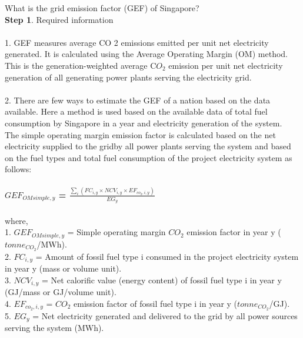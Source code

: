 \documentclass[11pt]{exam}
\begin{document}
\begin{questions}
\question
\label{Q25:Grid emission factor of Singapore}
What is the grid emission factor (GEF) of Singapore? \\
\textbf{Step 1}. Required information \\ \\
                1. GEF measures average CO 2 emissions emitted per unit net electricity generated. It is calculated using the Average Operating Margin (OM) method. This is the generation-weighted average C$O_{2}$ emission per unit net electricity generation of all generating power plants serving the electricity grid.  \\ \\
                2. There are few ways to estimate the GEF of a nation based on the data available. Here a method is used based on the available data of total fuel consumption by Singapore in a year and electricity generation of the system. \\ The simple operating margin emission factor is calculated based on the net electricity supplied to the gridby all power plants serving the system and based on the fuel types and total fuel consumption of the project electricity system as follows:\\ \\
                
      \textbf{ $GEF_{OMsimple,y}$ = $\frac{\sum_{i}(FC_{i,y} \times NCV_{i,y} \times EF_{co_{2},i,y})}{EG_{y}}$} \\ \\
        where, \\
        1. $GEF_{OMsimple,y}$ = Simple operating margin $CO_{2}$ emission factor in year y ($tonne_{CO_{2}}$/MWh). \\
        
        2. $FC_{i,y}$  = Amount of fossil fuel type i consumed in the project electricity system in year y (mass or volume unit). \\
        
        3. $NCV_{i,y}$ = Net calorific value (energy content) of fossil fuel type i in year y (GJ/mass or GJ/volume unit).  \\
        
        4. $EF_{co_{2},i,y}$ = $CO_{2}$ emission factor of fossil fuel type i in year y ($tonne_{CO_{2}}$/GJ).\\
        
        5. $EG_{y}$ = Net electricity generated and delivered to the grid by all power sources serving the system (MWh). \\
        

\end{questions}
\end{document}
